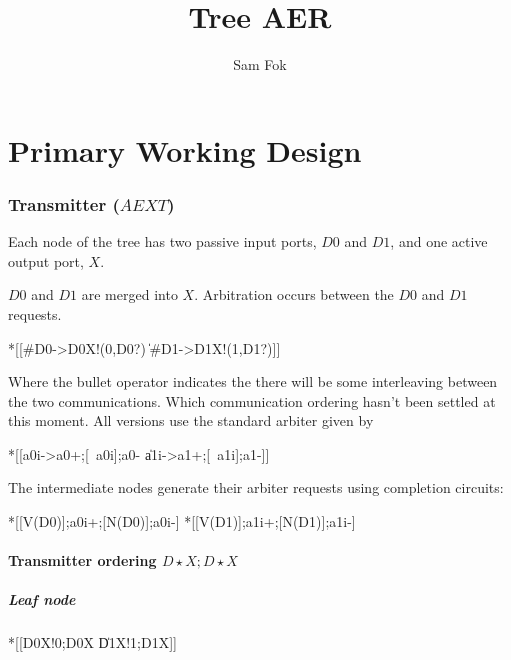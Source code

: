 \documentclass{article}
\begin{document}
\title{Tree AER}
\author{Sam Fok}
\maketitle

\part{Primary Working Design}

\section{Transmitter ($AEXT$)}

Each node of the tree has two passive input ports, $D0$ and $D1$, and one active output port, $X$.

$D0$ and $D1$ are merged into $X$. Arbitration occurs between the $D0$ and $D1$ requests. 

\begin{csp}
*[[#{D0}->D0\*X!(0,D0?)
  \|#{D1}->D1\*X!(1,D1?)]]
\end{csp}

Where the bullet operator indicates the there will be some interleaving between the two communications. Which communication ordering hasn't been settled at this moment. All versions use the standard arbiter given by

\begin{hse}
*[[a0i->a0+;[~a0i];a0-
  \|a1i->a1+;[~a1i];a1-]]
\end{hse}

The intermediate nodes generate their arbiter requests using completion circuits:

\begin{hse}
*[[V(D0)];a0i+;[N(D0)];a0i-]
*[[V(D1)];a1i+;[N(D1)];a1i-]
\end{hse}

\subsection{Transmitter ordering $D\!\star\!X;D\!\star\!X$}

\subsubsection{Leaf node}

\begin{csp}
*[[D0\star\!X!0;D0\star\!X
  \|D1\star\!X!1;D1\star\!X]]
\end{csp}
\end{document}
